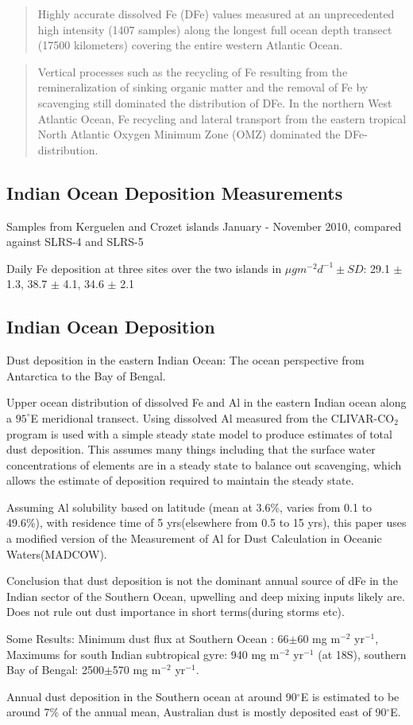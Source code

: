\begin{quote}
Highly accurate dissolved Fe (DFe) values measured at an unprecedented high intensity (1407 samples) along the longest full ocean depth transect (17500 kilometers) covering the entire western Atlantic Ocean.
\end{quote}

\begin{quote}
Vertical processes such as the recycling of Fe resulting from the remineralization of sinking organic matter and the removal of Fe by scavenging still dominated the distribution of DFe. In the northern West Atlantic Ocean, Fe recycling and lateral transport from the eastern tropical North Atlantic Oxygen Minimum Zone (OMZ) dominated the DFe-distribution.
\end{quote}

\subsection{Indian Ocean Deposition Measurements \cite{Heimburger_2013}}
Samples from Kerguelen and Crozet islands January - November 2010, compared against SLRS-4 and SLRS-5

Daily Fe deposition at three sites over the two islands in ${\mu}gm^{-2}d^{-1} \pm SD$:
29.1 $\pm$ 1.3, 38.7 $\pm$ 4.1, 34.6 $\pm$ 2.1

\subsection{Indian Ocean Deposition \cite{Grand_2015}}
Dust deposition in the eastern Indian Ocean: The ocean perspective from Antarctica to the Bay of Bengal.

Upper ocean distribution of dissolved Fe and Al in the eastern Indian ocean along a $95^{\circ}$E meridional transect.
Using dissolved Al measured from the CLIVAR-CO$_{2}$ program is used with a simple steady state model to produce estimates of total dust deposition. This assumes many things including that the surface water concentrations of elements are in a steady state to balance out scavenging, which allows the estimate of deposition required to maintain the steady state.

Assuming Al solubility based on latitude (mean at 3.6\%, varies from 0.1 to 49.6\%), with residence time of 5 yrs(elsewhere from 0.5 to 15 yrs), this paper uses a modified version of the Measurement of Al for Dust Calculation in Oceanic Waters(MADCOW).

Conclusion that dust deposition is not the dominant annual source of dFe in the Indian sector of the Southern Ocean, upwelling and deep mixing inputs likely are.
Does not rule out dust importance in short terms(during storms etc).

Some Results:
Minimum dust flux at Southern Ocean : 66$\pm$60 mg m$^{-2}$ yr$^{-1}$, 
Maximums for south Indian subtropical gyre: 940 mg m$^{-2}$ yr$^{-1}$ (at 18S),
southern Bay of Bengal: 2500$\pm$570 mg m$^{-2}$ yr$^{-1}$.

Annual dust deposition in the Southern ocean at around 90$^{\circ}$E is estimated to be around 7\% of the annual mean, Australian dust is mostly deposited east of 90$^{\circ}$E.

  
  
  